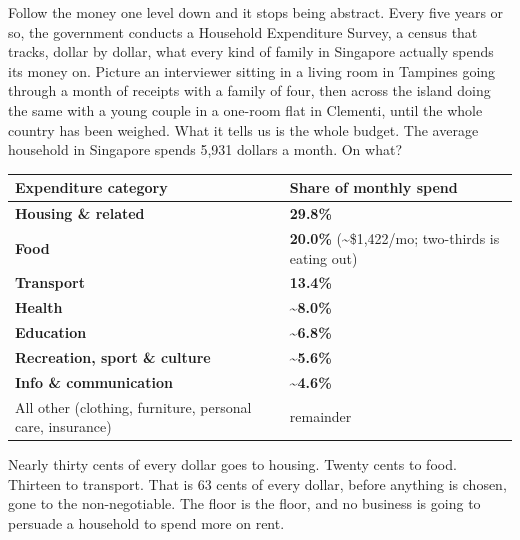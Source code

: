 \documentclass[10pt,twoside,openany]{memoir}
\renewcommand{\arraystretch}{1.1}
\begin{document}
{{{{{{{{{{{{{{{Follow the money one level down and it stops being abstract. Every five
years or so, the government conducts a Household Expenditure Survey, a
census that tracks, dollar by dollar, what every kind of family in
Singapore actually spends its money on. Picture an interviewer sitting
in a living room in Tampines going through a month of receipts with a
family of four, then across the island doing the same with a young
couple in a one-room flat in Clementi, until the whole country has been
weighed. What it tells us is the whole budget. The average household in
Singapore spends 5,931 dollars a month. On what?

{\def\LTcaptype{none} %
{\renewcommand{\arraystretch}{0.9}\begin{longtable}[]{@{}
  >{\raggedright\arraybackslash}p{}
  >{\raggedright\arraybackslash}p{}@{}}
\toprule\noalign{}
\begin{minipage}[b]{\linewidth}\raggedright
Expenditure category
\end{minipage} & \begin{minipage}[b]{\linewidth}\raggedright
Share of monthly spend
\end{minipage} \\
\midrule\noalign{}
\endhead
\bottomrule\noalign{}
\endlastfoot
\textbf{Housing \& related} & \textbf{29.8\%} \\
\textbf{Food} & \textbf{20.0\%} (\textasciitilde\$1,422/mo; two-thirds
is eating out) \\
\textbf{Transport} & \textbf{13.4\%} \\
\textbf{Health} & \textbf{\textasciitilde8.0\%} \\
\textbf{Education} & \textbf{\textasciitilde6.8\%} \\
\textbf{Recreation, sport \& culture} & \textbf{\textasciitilde5.6\%} \\
\textbf{Info \& communication} & \textbf{\textasciitilde4.6\%} \\
All other (clothing, furniture, personal care, insurance) & remainder \\
\end{longtable}
}

Nearly thirty cents of every dollar goes to housing. Twenty cents to
food. Thirteen to transport. That is 63 cents of every dollar, before
anything is chosen, gone to the non-negotiable. The floor is the floor,
and no business is going to persuade a household to spend more on rent.

}}}}}}}}}}}}}}}}
\end{document}
